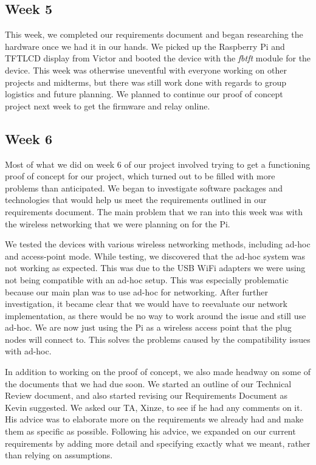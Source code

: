 \documentclass[letterpaper,10pt]{article}
\begin{document}
\subsection{Week 5}

This week, we completed our requirements document and began researching the
hardware once we had it in our hands. We picked up the Raspberry Pi and TFTLCD
display from Victor and booted the device with the \textit{fbtft} module for
the device. This week was otherwise uneventful with everyone working on other
projects and midterms, but there was still work done with regards to group
logistics and future planning. We planned to continue our proof of concept
project next week to get the firmware and relay online.

\subsection{Week 6}
 
Most of what we did on week 6 of our project involved trying to get a
functioning proof of concept for our project, which turned out to be filled
with more problems than anticipated. We began to investigate software packages
and technologies that would help us meet the requirements outlined in our
requirements document. The main problem that we ran into this week was with the
wireless networking that we were planning on for the Pi.

We tested the devices with various wireless networking methods, including
ad-hoc and access-point mode. While testing, we discovered that the ad-hoc
system was not working as expected. This was due to the USB WiFi adapters we
were using not being compatible with an ad-hoc setup. This was especially
problematic because our main plan was to use ad-hoc for networking. After
further investigation, it became clear that we would have to reevaluate our
network implementation, as there would be no way to work around the issue and
still use ad-hoc. We are now just using the Pi as a wireless access point that
the plug nodes will connect to. This solves the problems caused by the
compatibility issues with ad-hoc.

In addition to working on the proof of concept, we also made headway on some of
the documents that we had due soon. We started an outline of our Technical
Review document, and also started revising our Requirements Document as Kevin
suggested.  We asked our TA, Xinze, to see if he had any comments on it.  His
advice was to elaborate more on the requirements we already had and make them
as specific as possible. Following his advice, we expanded on our current
requirements by adding more detail and specifying exactly what we meant, rather
than relying on assumptions.
\end{document}
